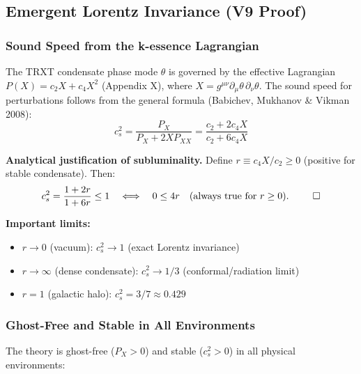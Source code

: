 \documentclass[a4paper,12pt]{article}
\begin{document}
\subsection{Emergent Lorentz Invariance (V9 Proof)}

\subsubsection{Sound Speed from the k-essence Lagrangian}
The TRXT condensate phase mode $\theta$ is governed by the effective Lagrangian $P(X) = c_2 X + c_4 X^2$ (Appendix X), where $X = g^{\mu\nu}\partial_\mu\theta\,\partial_\nu\theta$. The sound speed for perturbations follows from the general formula (Babichev, Mukhanov \& Vikman 2008):
\begin{equation}
    c_s^2 = \frac{P_X}{P_X + 2X P_{XX}} = \frac{c_2 + 2c_4 X}{c_2 + 6c_4 X}
    \label{eq:cs_kessence}
\end{equation}

\textbf{Analytical justification of subluminality.} Define $r \equiv c_4 X / c_2 \geq 0$ (positive for stable condensate). Then:
\begin{equation}
    c_s^2 = \frac{1 + 2r}{1 + 6r} \leq 1 \quad \Longleftrightarrow \quad 0 \leq 4r \quad \text{(always true for } r \geq 0\text{). } \qed
\end{equation}

\textbf{Important limits:}
\begin{itemize}
    \item $r \to 0$ (vacuum): $c_s^2 \to 1$ (exact Lorentz invariance)
    \item $r \to \infty$ (dense condensate): $c_s^2 \to 1/3$ (conformal/radiation limit)
    \item $r = 1$ (galactic halo): $c_s^2 = 3/7 \approx 0.429$
\end{itemize}

\subsubsection{Ghost-Free and Stable in All Environments}
The theory is ghost-free ($P_X > 0$) and stable ($c_s^2 > 0$) in all physical environments:
\end{document}
